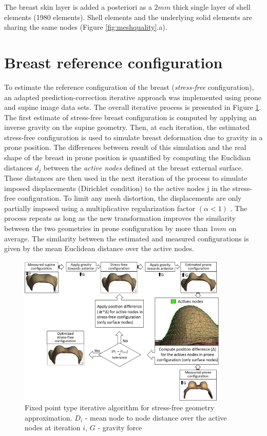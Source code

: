 The breast skin layer is added a posteriori   as a $2mm$ thick single layer of shell elements (1980 elements). Shell elements and the underlying solid elements are sharing the same nodes (Figure \ref{fig:meshquality}.a).



\section{Breast reference configuration}\label{section:myStressFree}
To estimate the reference configuration of the breast (\textit{stress-free} configuration), an adapted prediction-correction iterative approach was implemented \citep{eiben_breast_2014} using prone and supine image data sets. The overall iterative process is presented in Figure \ref{fig:myfixedpointalgo}. The first estimate of stress-free breast configuration is computed by applying an inverse gravity on the supine geometry. Then, at each iteration, the estimated stress-free configuration is used to simulate breast deformation due to gravity in a prone position. The differences between result of this simulation and the real shape of the breast in prone position is quantified by computing the Euclidian distances $d_j$ between the \textit{active nodes} defined at the breast external surface. These distances are then used in the next iteration of the process to simulate imposed displacements (Dirichlet condition) to the active nodes j in the stress-free configuration. To limit any mesh distortion, the displacements are only partially imposed using a multiplicative regularization factor $ (\alpha <1)$ . The process repeats as long as the new transformation improves the similarity between the two geometries in prone configuration by more than $1mm$ on average. The similarity between the estimated and measured configurations is given by the mean Euclidean distance over the active nodes.                                                              

\begin{figure}[!h]
\centering
\includegraphics[width=0.9\textwidth,keepaspectratio]{figures/stress_free_config_algo.jpg} 
\caption{Fixed point type iterative algorithm for stress-free geometry approximation. $D_i$ - mean node to node distance over the active nodes at iteration $i$, $G$ - gravity force}\label{fig:myfixedpointalgo}
\end{figure}

